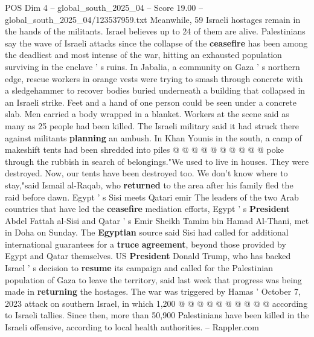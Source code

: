 \begin{textsample}{POS Dim 4 – global\_south\_2025\_04 – Score 19.00 – global\_south\_2025\_04/123537959.txt}
Meanwhile, 59 Israeli hostages remain in the hands of the militants.
Israel believes up to 24 of them are alive.
Palestinians say the wave of Israeli attacks since the collapse of the \textbf{ceasefire} has been among the deadliest and most intense of the war, hitting an exhausted population surviving in the enclave ' s ruins.
In Jabalia, a community on Gaza ' s northern edge, rescue workers in orange vests were trying to smash through concrete with a sledgehammer to recover bodies buried underneath a building that collapsed in an Israeli strike.
Feet and a hand of one person could be seen under a concrete slab.
Men carried a body wrapped in a blanket.
Workers at the scene said as many as 25 people had been killed.
The Israeli military said it had struck there against militants \textbf{planning} an ambush.
In Khan Younis in the south, a camp of makeshift tents had been shredded into piles @ @ @ @ @ @ @ @ @ @ poke through the rubbish in search of belongings."We used to live in houses.
They were destroyed.
Now, our tents have been destroyed too.
We don't know where to stay,"said Ismail al-Raqab, who \textbf{returned} to the area after his family fled the raid before dawn.
Egypt ' s Sisi meets Qatari emir The leaders of the two Arab countries that have led the \textbf{ceasefire} mediation efforts, Egypt ' s \textbf{President} Abdel Fattah al-Sisi and Qatar ' s Emir Sheikh Tamim bin Hamad Al-Thani, met in Doha on Sunday.
The \textbf{Egyptian} source said Sisi had called for additional international guarantees for a \textbf{truce} \textbf{agreement}, beyond those provided by Egypt and Qatar themselves.
US \textbf{President} Donald Trump, who has backed Israel ' s decision to \textbf{resume} its campaign and called for the Palestinian population of Gaza to leave the territory, said last week that progress was being made in \textbf{returning} the hostages.
The war was triggered by Hamas ' October 7, 2023 attack on southern Israel, in which 1,200 @ @ @ @ @ @ @ @ @ @ according to Israeli tallies.
Since then, more than 50,900 Palestinians have been killed in the Israeli offensive, according to local health authorities. -- Rappler.com

\end{textsample}
